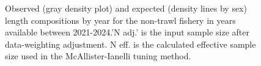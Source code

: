 \documentclass[
]{scrartcl}
\begin{document}
\begin{figure}[H]


\caption{\label{fig-len-fit-nt-2}Observed (gray density plot) and
expected (density lines by sex) length compositions by year for the
non-trawl fishery in years available between 2021-2024.'N adj.' is the
input sample size after data-weighting adjustment. N eff. is the
calculated effective sample size used in the McAllister-Ianelli tuning
method.}

\end{figure}%
\end{document}
